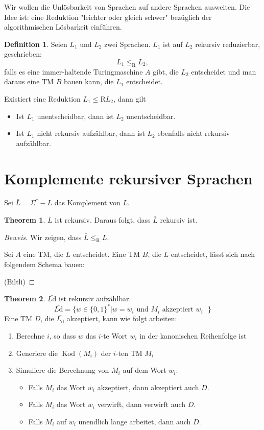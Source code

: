 \documentclass[11pt]{article} %
\theoremstyle{definition}
\newtheorem{definition}{Definition}
\newtheorem{theorem}{Theorem}
\begin{document}
Wir wollen die Unlösbarkeit von Sprachen auf andere Sprachen ausweiten. Die Idee ist: eine Reduktion "leichter oder gleich schwer" bezüglich der algorithmischen Lösbarkeit einführen.

\begin{definition}
Seien $L_1$ und $L_2$ zwei Sprachen. $L_1$ ist auf $L_2$ rekursiv reduzierbar, geschrieben:
\[
L_1 \le_\textrm{R} L_2,
\]
falls es eine immer-haltende Turingmaschine $A$ gibt, die $L_2$ entscheidet und man daraus eine TM $B$ bauen kann, die $L_1$ entscheidet.

Existiert eine Reduktion $L_1 \le\textrm{R} L_2$, dann gilt
\begin{itemize}
\item Ist $L_1$ unentscheidbar, dann ist $L_2$ unentscheidbar.
\item Ist $L_1$ nicht rekursiv aufzählbar, dann ist $L_2$ ebenfalls nicht rekursiv aufzählbar.
\end{itemize}
\end{definition}

\section{Komplemente rekursiver Sprachen}

Sei $\bar{L} = \Sigma^* - L$ das Komplement von $L$.

\begin{theorem}
$L$ ist rekursiv. Daraus folgt, dass $\bar{L}$ rekursiv ist.
\end{theorem}
\begin{proof}[Beweis]
Wir zeigen, dass $\bar{L} \le_\textrm{R} L$.

Sei $A$ eine TM, die $L$ entscheidet. Eine TM $B$, die $\bar{L}$ entscheidet, lässt sich nach folgendem Schema bauen:

(Biltli)
\end{proof}

\begin{theorem}
$\bar{L\textrm{d}}$ ist rekursiv aufzählbar.
\[
\bar{L\textrm{d}} = \{w \in \{0,1\}^* | w = w_i \textrm{ und $M_i$ akzeptiert $w_i$ } \}
\]
Eine TM $D$, die $\bar{L_\textrm{d}}$ akzeptiert, kann wie folgt arbeiten:
\begin{enumerate}
\item Berechne $i$, so dass $w$ das $i$-te Wort $w_i$ in der kanonischen Reihenfolge ist
\item Generiere die $\operatorname{Kod}(M_i)$ der $i$-ten TM $M_i$
\item Simuliere die Berechnung von $M_i$ auf dem Wort $w_i$:
\begin{itemize}
\item Falls $M_i$ das Wort $w_i$ akzeptiert, dann akzeptiert auch $D$.
\item Falls $M_i$ das Wort $w_i$ verwirft, dann verwirft auch $D$.
\item Falls $M_i$ auf $w_i$ unendlich lange arbeitet, dann auch $D$.
\end{itemize}
\end{enumerate}
\end{theorem}
\end{document}
